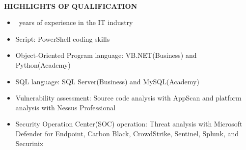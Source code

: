 \begin{center}
    \hrulefill \\
    \begin{large}
        \textbf{HIGHLIGHTS OF QUALIFICATION}
    \end{large}
\end{center}

\begin{itemize}
    \item \FPround{}\workExperience\ years of experience in the IT industry
    \item Script: PowerShell coding skills
    \item Object-Oriented Program language: VB.NET(Business) and Python(Academy)
    \item SQL language: SQL Server(Business) and MySQL(Academy)
    \item Vulnerability assessment: Source code analysis with AppScan and platform analysis with Nessus Professional
    \item Security Operation Center(SOC) operation: Threat analysis with Microsoft Defender for Endpoint, Carbon Black, CrowdStrike, Sentinel, Splunk, and Securinix
\end{itemize}